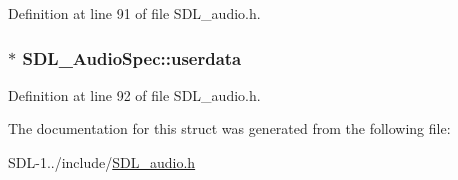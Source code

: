 Definition at line 91 of file S\+D\+L\+\_\+audio.\+h.

\hypertarget{struct_s_d_l___audio_spec_aeec9481666f5f0982c98d3878f175d9b}{}
\subsubsection[{userdata}]{$\ast$ S\+D\+L\+\_\+\+Audio\+Spec\+::userdata}\label{struct_s_d_l___audio_spec_aeec9481666f5f0982c98d3878f175d9b}


Definition at line 92 of file S\+D\+L\+\_\+audio.\+h.



The documentation for this struct was generated from the following file\+:\begin{DoxyCompactItemize}
\item 
S\+D\+L-\/1../include/\hyperlink{_s_d_l__audio_8h}{S\+D\+L\+\_\+audio.\+h}\end{DoxyCompactItemize}
